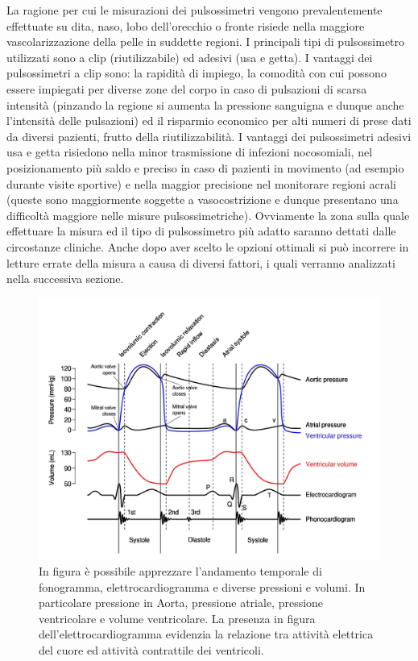 \documentclass[12pt,a4paper, twoside, openright]{report}
\begin{document}
La ragione per cui le misurazioni dei pulsossimetri vengono prevalentemente effettuate su dita, naso, lobo dell'orecchio o fronte risiede nella maggiore vascolarizzazione della pelle in suddette regioni. 
I principali tipi di pulsossimetro utilizzati sono a clip (riutilizzabile) ed adesivi (usa e getta). 
I vantaggi dei pulsossimetri a clip sono: la rapidità di impiego, la comodità con cui possono essere impiegati per diverse zone del corpo in caso di pulsazioni di scarsa intensità (pinzando la regione si aumenta la pressione sanguigna e dunque anche l'intensità delle pulsazioni) ed il risparmio economico per alti numeri di prese dati da diversi pazienti, frutto della riutilizzabilità. 
I vantaggi dei pulsossimetri adesivi usa e getta risiedono nella minor trasmissione di infezioni nocosomiali, nel posizionamento più saldo e preciso in caso di pazienti in movimento (ad esempio durante visite sportive) e nella maggior precisione nel monitorare regioni acrali (queste sono maggiormente soggette a vasocostrizione e dunque presentano una difficoltà maggiore nelle misure pulsossimetriche). 
Ovviamente la zona sulla quale effettuare la misura ed il tipo di pulsossimetro più adatto saranno dettati dalle circostanze cliniche. 
Anche dopo aver scelto le opzioni ottimali si può incorrere in letture errate della misura a causa di diversi fattori, i quali verranno analizzati nella successiva sezione.

\begin{figure}[h!]
	\includegraphics[width=\textwidth]{Wiggers_Diagram.jpg}
	\caption{In figura è possibile apprezzare l'andamento temporale di fonogramma, 					 	 elettrocardiogramma e diverse pressioni e volumi.
			 In particolare pressione in Aorta, pressione atriale, pressione 							 ventricolare e volume ventricolare.
			 La presenza in figura dell'elettrocardiogramma evidenzia la relazione tra 				 	 attività elettrica del cuore ed attività contrattile dei ventricoli.}
	\label{fig:Wiggers_Diagram}
\end{figure}
\end{document}
